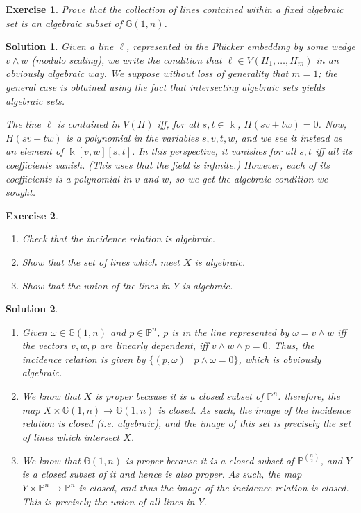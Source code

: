 \documentclass{article}
\newtheorem{ex}{Exercise}
\theoremstyle{nonumberplain}
\newtheorem{sol}{Solution}
\newcommand{\kk}{\Bbbk}
\newcommand{\PP}{\mathbb{P}}
\newcommand{\GG}{\mathbb{G}}
\begin{document}
\begin{ex}
Prove that the collection of lines contained within a fixed algebraic set is an algebraic subset of $\GG(1,n)$.
\end{ex}

\begin{sol}
Given a line $\ell$, represented in the Plücker embedding by some wedge $v \wedge w$ (modulo scaling), we write the condition that $\ell \in V(H_1, \dots, H_m)$ in an obviously algebraic way. We suppose without loss of generality that $m = 1$; the general case is obtained using the fact that intersecting algebraic sets yields algebraic sets.

The line $\ell$ is contained in $V(H)$ iff, for all $s, t \in \kk$, $H(s v + t w) = 0$. Now, $H(sv+tw)$ is a polynomial in the variables $s,v,t,w$, and we see it instead as an element of $\kk[v,w][s,t]$. In this perspective, it vanishes for all $s, t$ iff all its coefficients vanish. (This uses that the field is infinite.) However, each of its coefficients is a polynomial in $v$ and $w$, so we get the algebraic condition we sought.
\end{sol}

\begin{ex}
\leavevmode
\begin{enumerate}
\item Check that the incidence relation is algebraic.
\item Show that the set of lines which meet $X$ is algebraic.
\item Show that the union of the lines in $Y$ is algebraic.
\end{enumerate}
\end{ex}

\begin{sol}
\leavevmode
\begin{enumerate}
\item Given $\omega \in \GG(1,n)$ and $p \in \PP^n$, $p$ is in the line represented by $\omega = v \wedge w$ iff the vectors $v,w,p$ are linearly dependent, iff $v \wedge w \wedge p = 0$. Thus, the incidence relation is given by $\{(p, \omega) \mid p \wedge \omega = 0\}$, which is obviously algebraic.
\item We know that $X$ is proper because it is a closed subset of $\PP^n$. therefore, the map $X \times \GG(1,n) \to \GG(1,n)$ is closed. As such, the image of the incidence relation is closed (i.e. algebraic), and the image of this set is precisely the set of lines which intersect $X$.
\item We know that $\GG(1,n)$ is proper because it is a closed subset of $\PP^{\binom n 2}$, and $Y$ is a closed subset of it and hence is also proper. As such, the map $Y \times \PP^n \to \PP^n$ is closed, and thus the image of the incidence relation is closed. This is precisely the union of all lines in $Y$.
\end{enumerate}
\end{sol}
\end{document}
